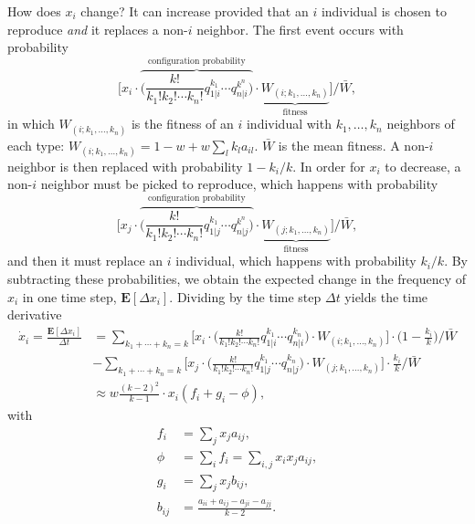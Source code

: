 \documentclass[14pt, justified]{tufte-handout}
\begin{document}
How does $x_i$ change?
It can increase provided that an $i$ individual is chosen to reproduce \emph{and} it replaces a non-$i$ neighbor.
The first event occurs with probability
\begin{equation}
    \Big[ x_i \cdot \overbrace{\Big( \frac{k!}{k_1! k_2! \cdots k_n!} q_{1|i}^{k_1} \cdots q_{n|i}^{k^n} \Big)}^{\textrm{configuration probability}} \cdot \underbrace{W_{(i; k_1, \ldots ,k_n)}}_{\textrm{fitness}} \Big] \Big/ \bar{W},
\end{equation}
in which $W_{(i; k_1, \ldots ,k_n)}$ is the fitness of an $i$ individual with $k_1, \ldots , k_n$ neighbors of each type: $W_{(i; k_1, \ldots ,k_n)} = 1 - w + w \sum_l k_l a_{il}$.
$\bar{W}$ is the mean fitness.
A non-$i$ neighbor is then replaced with probability $1 - k_i/k$.
In order for $x_i$ to decrease, a non-$i$ neighbor must be picked to reproduce, which happens with probability
\begin{equation}
    \Big[ x_j \cdot \overbrace{\Big( \frac{k!}{k_1! k_2! \cdots k_n!} q_{1|j}^{k_1} \cdots q_{n|j}^{k^n} \Big)}^{\textrm{configuration probability}} \cdot \underbrace{W_{(j; k_1, \ldots ,k_n)}}_{\textrm{fitness}} \Big] \Big/ \bar{W},
\end{equation}
and then it must replace an $i$ individual, which happens with probability $k_i/k$.
By subtracting these probabilities, we obtain the expected change in the frequency of $x_i$ in one time step, $\mathbf{E}[\Delta x_i]$.
Dividing by the time step $\Delta t$ yields the time derivative
\begin{equation}
    \begin{split}
        \dot{x}_i = \frac{\mathbf{E}[\Delta x_i]}{\Delta t} & = \sum_{k_1 + \cdots + k_n = k}  \Big[ x_i \cdot \Big( \frac{k!}{k_1! k_2! \cdots k_n!} q_{1|i}^{k_1} \cdots q_{n|i}^{k_n} \Big) \cdot W_{(i; k_1, \ldots ,k_n)} \Big] \cdot \Big(1 - \frac{k_i}{k} \Big)\Big/ \bar{W}
        \\
        & - \sum_{k_1 + \cdots + k_n = k} \Big[ x_j \cdot \Big( \frac{k!}{k_1! k_2! \cdots k_n!} q_{1|j}^{k_1} \cdots q_{n|j}^{k_n} \Big) \cdot W_{(j; k_1, \ldots ,k_n)} \Big] \cdot \frac{k_i}{k} \Big/ \bar{W}
        \\
        & \approx w \frac{(k-2)^2}{k-1} \cdot x_i (f_i + g_i - \phi),
    \end{split}
    \label{eq:bd_replicator}
\end{equation}
with
\begin{equation}
    \begin{split}
        f_i & = \sum_j x_j a_{ij},
        \\
        \phi & = \sum_i f_i = \sum_{i,j} x_i x_j a_{ij},
        \\
        g_i & = \sum_j x_j b_{ij},
        \\
        b_{ij} & = \frac{a_{ii} + a_{ij} - a_{ji} - a_{jj}}{k-2}.
    \end{split}
    \label{eq:bd_coeffs}
\end{equation}
\end{document}
